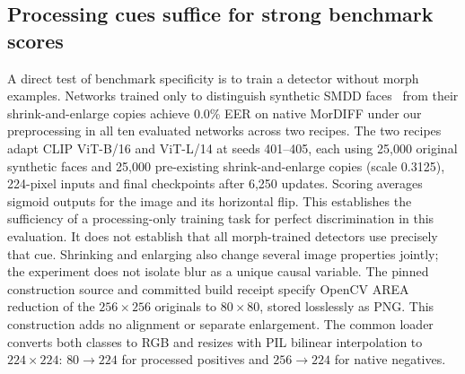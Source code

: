 \subsection{Processing cues suffice for strong benchmark scores}
\label{sec:artifact_results}
A direct test of benchmark specificity is to train a detector without morph examples. Networks trained only to distinguish synthetic SMDD faces~\cite{damer2022smdd} from their shrink-and-enlarge copies achieve 0.0\% EER on native MorDIFF under our preprocessing in all ten evaluated networks across two recipes. The two recipes adapt CLIP ViT-B/16 and ViT-L/14 at seeds 401--405, each using 25,000 original synthetic faces and 25,000 pre-existing shrink-and-enlarge copies (scale 0.3125), 224-pixel inputs and final checkpoints after 6,250 updates. Scoring averages sigmoid outputs for the image and its horizontal flip. This establishes the sufficiency of a processing-only training task for perfect discrimination in this evaluation. It does not establish that all morph-trained detectors use precisely that cue. Shrinking and enlarging also change several image properties jointly; the experiment does not isolate blur as a unique causal variable.
The pinned construction source and committed build receipt specify OpenCV AREA reduction of the $256\times256$ originals to $80\times80$, stored losslessly as PNG. This construction adds no alignment or separate enlargement. The common loader converts both classes to RGB and resizes with PIL bilinear interpolation to $224\times224$: $80\to224$ for processed positives and $256\to224$ for native negatives.

